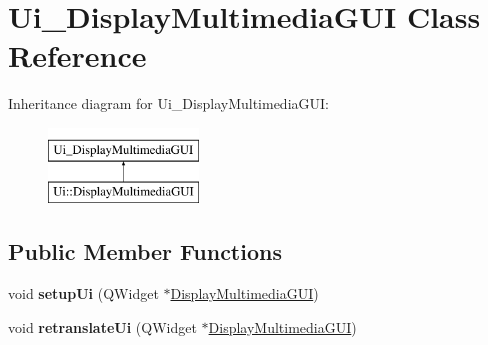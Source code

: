 \hypertarget{classUi__DisplayMultimediaGUI}{}\section{Ui\+\_\+\+Display\+Multimedia\+G\+UI Class Reference}
\label{classUi__DisplayMultimediaGUI}
Inheritance diagram for Ui\+\_\+\+Display\+Multimedia\+G\+UI\+:\begin{figure}[H]
\begin{center}
\leavevmode
\includegraphics[height=2.000000cm]{classUi__DisplayMultimediaGUI}
\end{center}
\end{figure}
\subsection*{Public Member Functions}
\begin{DoxyCompactItemize}
\item 
void {\bfseries setup\+Ui} (Q\+Widget $\ast$\hyperlink{classDisplayMultimediaGUI}{Display\+Multimedia\+G\+UI})\hypertarget{classUi__DisplayMultimediaGUI_a2486c802f68cdcfad6f6ff27d05ef107}{}\label{classUi__DisplayMultimediaGUI_a2486c802f68cdcfad6f6ff27d05ef107}

\item 
void {\bfseries retranslate\+Ui} (Q\+Widget $\ast$\hyperlink{classDisplayMultimediaGUI}{Display\+Multimedia\+G\+UI})\hypertarget{classUi__DisplayMultimediaGUI_a824e7bd75e666ec869d1a9655af89ea1}{}\label{classUi__DisplayMultimediaGUI_a824e7bd75e666ec869d1a9655af89ea1}

\end{DoxyCompactItemize}
